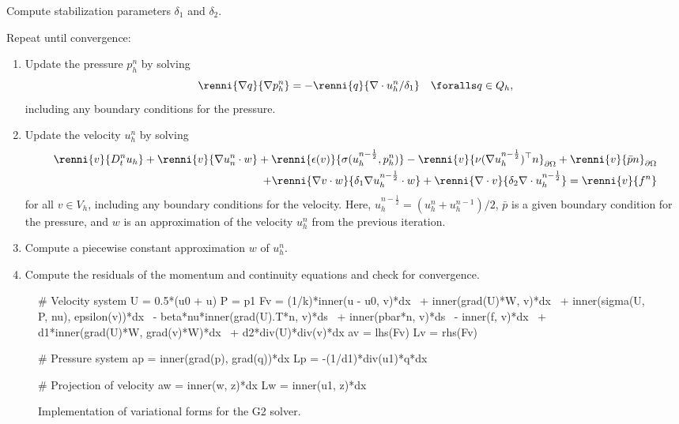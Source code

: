 {
  \item
    Compute stabilization parameters $\delta_1$ and $\delta_2$.

  \item
    Repeat until convergence:

    \begin{enumerate}
    \item
      Update the pressure $p^n_h$ by solving
      \begin{equation}\label{eq:g2_scheme,1}
        \renni{\nabla q}{\nabla p_h^n} = - \renni{q}{\nabla \cdot u_h^n/\delta_1}
        \quad \foralls q \in Q_h,
      \end{equation}
      including any boundary conditions for the pressure.

    \item
      Update the velocity $u^n_h$ by solving
      \begin{equation}\label{eq:g2_scheme,2}
        \begin{split}
          \renni{v}{D_t^n u_h}
          + \renni{v}{\nabla u_n^n \cdot w}
          + \renni{\epsilon(v)}{\sigma(u_h^{n-\frac{1}{2}}, p_h^n)}
          - \renni{v}{\nu (\nabla u_h^{n-\frac{1}{2}})^{\top} n}_{\partial\Omega}
          + \renni{v}{\bar{p} n}_{\partial\Omega} \\
          + \renni{\nabla v \cdot w}{\delta_1 \nabla u_h^{n-\frac{1}{2}} \cdot w}
          + \renni{\nabla \cdot v}{\delta_2 \nabla \cdot u_h^{n-\frac{1}{2}}}
          = \renni{v}{f^n}
        \end{split}
      \end{equation}
      for all $v \in V_h$, including any boundary conditions for the
      velocity. Here, $u_h^{n-\frac{1}{2}} = (u_h^n + u_h^{n-1}) / 2$,
      $\bar{p}$ is a given boundary condition for the pressure, and
      $w$ is an approximation of the velocity $u^n_h$ from the
      previous iteration.

    \item
      Compute a piecewise constant approximation $w$ of $u^n_h$.

    \item
      Compute the residuals of the momentum and continuity equations
      and check for convergence.

    \end{enumerate}
}

\begin{figure}
\begin{python}
# Velocity system
U = 0.5*(u0 + u)
P = p1
Fv = (1/k)*inner(u - u0, v)*dx \
   + inner(grad(U)*W, v)*dx \
   + inner(sigma(U, P, nu), epsilon(v))*dx \
   - beta*nu*inner(grad(U).T*n, v)*ds \
   + inner(pbar*n, v)*ds \
   - inner(f, v)*dx \
   + d1*inner(grad(U)*W, grad(v)*W)*dx \
   + d2*div(U)*div(v)*dx
av = lhs(Fv)
Lv = rhs(Fv)

# Pressure system
ap = inner(grad(p), grad(q))*dx
Lp = -(1/d1)*div(u1)*q*dx

# Projection of velocity
aw = inner(w, z)*dx
Lw = inner(u1, z)*dx
\end{python}
\caption{Implementation of variational forms for the G2 solver.}
\label{fig:g2_code}
\end{figure}

